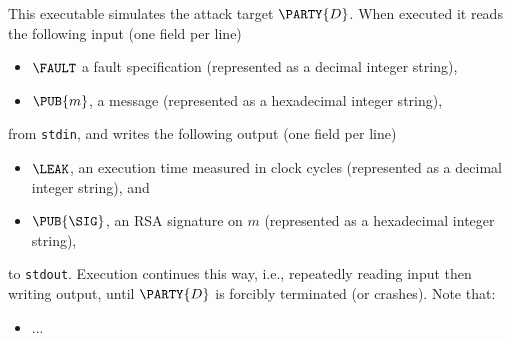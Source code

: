 %




\begin{center}

\end{center}





This executable simulates the attack target $\PARTY{D}$.  When executed it 
 reads the following  input (one field per line)

\begin{itemize}
\item $\FAULT$
      a  fault specification
      (represented as a                       decimal integer string),
\item $\PUB{m}$,
      a message
      (represented as a                   hexadecimal integer string),
\end{itemize}

\noindent
from \lstinline[language={bash}]{stdin},
and 
writes the following output (one field per line)

\begin{itemize}
\item $\LEAK$,
      an execution time measured in clock cycles
      (represented as a                       decimal integer string),
      and
\item $\PUB{\SIG}$,
      an RSA signature on $m$
      (represented as a                   hexadecimal integer string),
\end{itemize}

\noindent
to   \lstinline[language={bash}]{stdout}.
Execution continues this way, i.e., repeatedly reading input then writing 
output, until $\PARTY{D}$ is forcibly terminated (or crashes).  
Note that:

\begin{itemize}
\item ... %
\end{itemize}

